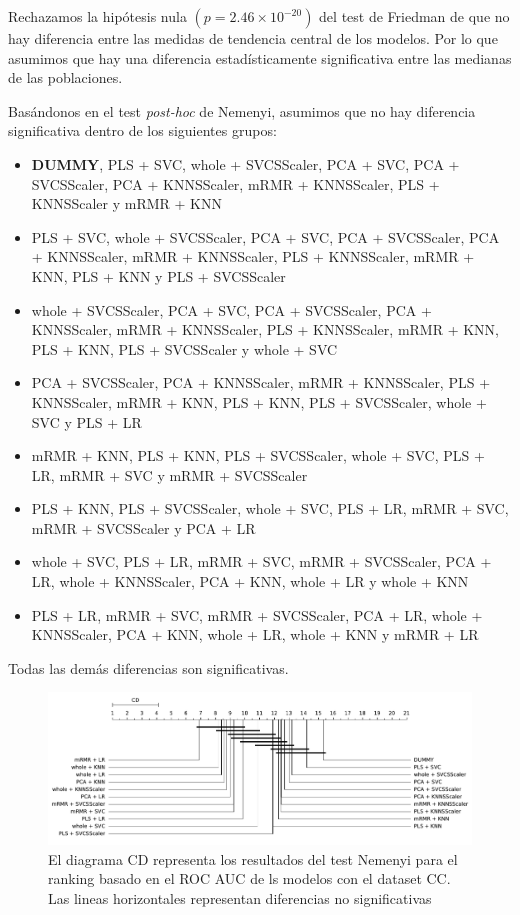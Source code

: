 \documentclass[a4paper,oneside,11pt,leqno]{article}
\begin{document}
	Rechazamos la hipótesis nula $(p=2.46\times 10^{-20})$ del test de Friedman de que no hay diferencia entre las medidas de tendencia central de los modelos. Por lo que asumimos que hay una diferencia estadísticamente significativa entre las medianas de las poblaciones. 
	
	Basándonos en el test \textit{post-hoc} de Nemenyi, asumimos que no hay diferencia significativa dentro de los siguientes grupos:
	
	\begin{itemize}
		\item  \textbf{DUMMY}, PLS + SVC, whole + SVCSScaler, PCA + SVC, PCA + SVCSScaler, PCA + KNNSScaler, mRMR + KNNSScaler, PLS + KNNSScaler y mRMR + KNN
		
		\item PLS + SVC, whole + SVCSScaler, PCA + SVC, PCA + SVCSScaler, PCA + KNNSScaler, mRMR + KNNSScaler, PLS + KNNSScaler, mRMR + KNN, PLS + KNN y PLS + SVCSScaler
		
		\item whole + SVCSScaler, PCA + SVC, PCA + SVCSScaler, PCA + KNNSScaler, mRMR + KNNSScaler, PLS + KNNSScaler, mRMR + KNN, PLS + KNN, PLS + SVCSScaler y whole + SVC
		
		\item PCA + SVCSScaler, PCA + KNNSScaler, mRMR + KNNSScaler, PLS + KNNSScaler, mRMR + KNN, PLS + KNN, PLS + SVCSScaler, whole + SVC y PLS + LR
		
		\item mRMR + KNN, PLS + KNN, PLS + SVCSScaler, whole + SVC, PLS + LR, mRMR + SVC y mRMR + SVCSScaler
		
		\item PLS + KNN, PLS + SVCSScaler, whole + SVC, PLS + LR, mRMR + SVC, mRMR + SVCSScaler y PCA + LR 
		
		\item  whole + SVC, PLS + LR, mRMR + SVC, mRMR + SVCSScaler, PCA + LR, whole + KNNSScaler, PCA + KNN, whole + LR y whole + KNN
		
		\item  PLS + LR, mRMR + SVC, mRMR + SVCSScaler, PCA + LR, whole + KNNSScaler, PCA + KNN, whole + LR, whole + KNN y mRMR + LR
		
	\end{itemize}
	Todas las demás diferencias son significativas.
	 
	\begin{figure}[h]
		\includegraphics[width=\linewidth]{stat_results_cc.pdf}
		\caption{El diagrama CD representa los resultados del test Nemenyi para el ranking basado en el ROC AUC de ls modelos con el dataset CC. Las lineas horizontales representan diferencias no significativas}
		\label{fig:stats_fig_cc}
	\end{figure}
\end{document}
